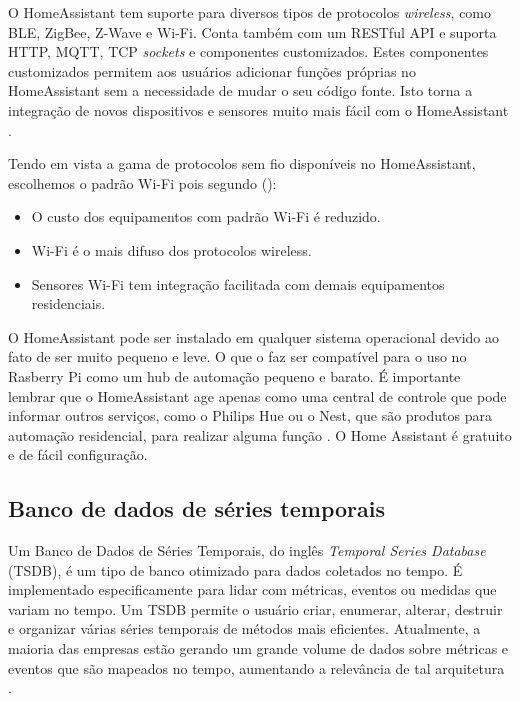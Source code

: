 O HomeAssistant tem suporte para diversos tipos de protocolos \textit{wireless}, como BLE, ZigBee, Z-Wave e Wi-Fi. Conta também com um RESTful API e suporta HTTP, MQTT, TCP \textit{sockets} e componentes customizados. Estes componentes customizados permitem aos usuários adicionar funções próprias no HomeAssistant sem a necessidade de mudar o seu código fonte. Isto torna a integração de novos dispositivos e sensores muito mais fácil com o HomeAssistant \cite{Gomes2018}.



Tendo em vista a gama de protocolos sem fio disponíveis no HomeAssistant, escolhemos o padrão Wi-Fi pois segundo \citeauthor{Lundrigan2017} (\citeyear{Lundrigan2017}):

\begin{itemize}
	\item O custo dos equipamentos com padrão Wi-Fi é reduzido.
	\item Wi-Fi é o mais difuso dos protocolos wireless.
	\item Sensores Wi-Fi tem integração facilitada com demais equipamentos residenciais.
\end{itemize}

O HomeAssistant pode ser instalado em qualquer sistema operacional devido ao fato de ser muito pequeno e leve. O que o faz ser compatível para o uso no Rasberry Pi como um hub de automação pequeno e barato. É importante lembrar que o HomeAssistant age apenas como uma central de controle que pode informar outros serviços, como o Philips Hue ou o Nest, que são produtos para automação residencial, para realizar alguma função \cite{AlmeidaCosta}. O Home Assistant é gratuito e de fácil configuração.

\subsection{Banco de dados de séries temporais}

Um Banco de Dados de Séries Temporais, do inglês \textit{Temporal Series Database} (TSDB), é um tipo de banco otimizado para dados coletados no tempo. É implementado especificamente para lidar com métricas, eventos ou medidas que variam no tempo. Um TSDB permite o usuário criar, enumerar, alterar, destruir e organizar várias séries temporais de métodos mais eficientes. Atualmente, a maioria das empresas estão gerando um grande volume de dados sobre métricas e eventos que são mapeados no tempo, aumentando a relevância de tal arquitetura \cite{Noor2017}.

